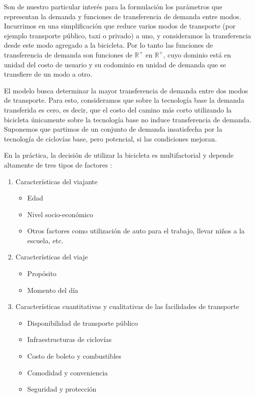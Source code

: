 
Son de nuestro particular interés para la formulación los parámetros que representan la demanda y funciones de transferencia de demanda entre modos. Incurrimos en una simplificación que reduce varios modos de transporte (por ejemplo transporte público, taxi o privado) a uno, y consideramos la transferencia desde este modo agregado a la bicicleta. Por lo tanto las funciones de transferencia de demanda son funciones de $\mathbb{R}^+$ en $\mathbb{R}^+$, cuyo dominio está en unidad del costo de usuario y su codominio en unidad de demanda que se transfiere de un modo a otro.

El modelo busca determinar la mayor transferencia de demanda entre dos modos de transporte. Para esto, consideramos que sobre la tecnología base la demanda transferida es cero, es decir, que el costo del camino más corto utilizando la bicicleta únicamente sobre la tecnología base no induce transferencia de demanda. Suponemos que partimos de un conjunto de demanda insatisfecha por la tecnología de ciclovías base, pero potencial, si las condiciones mejoran.

En la práctica, la decisión de utilizar la bicicleta es multifactorial y depende altamente de tres tipos de factores \parencite{ortuz2011}:

\begin{enumerate}
  \item{
      Características del viajante
        \begin{itemize}
          \item{Edad}
          \item{Nivel socio-económico}
          \item{Otros factores como utilización de auto para el trabajo, llevar niños a la escuela, etc.}
        \end{itemize}
  }
  \item{
      Características del viaje
        \begin{itemize}
          \item{Propósito}
          \item{Momento del día}
        \end{itemize}
  }
\item{\label{bicycleusagefactors}
      Características cuantitativas y cualitativas de las facilidades de transporte
      \begin{itemize}
          \item{Disponibilidad de transporte público}
          \item{Infraestructuras de ciclovías}
          \item{Costo de boleto y combustibles}
          \item{Comodidad y conveniencia}
          \item{Seguridad y protección}
      \end{itemize}
  }
\end{enumerate}

